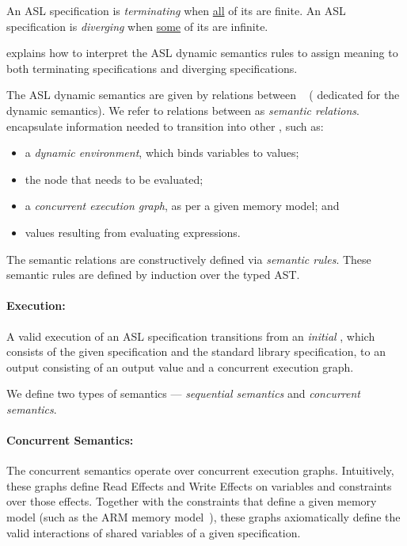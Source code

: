 An ASL specification is \emph{terminating} when \underline{all} of its \derivationtreesterm{} are finite.
An ASL specification is \emph{diverging} when \underline{some} of its \derivationtreesterm{} are
infinite.

 explains how to interpret
the ASL dynamic semantics rules to assign meaning to both terminating specifications
and diverging specifications.

\hypertarget{def-semanticconfiguration}{}
The ASL dynamic semantics are given by relations between
\emph{\semanticsconfigurationsterm}~\cite{SemanticsWithApplicationsBook}
(\configurationsterm{} dedicated for the dynamic semantics).
We refer to relations between \semanticsconfigurationsterm{} as \emph{semantic relations}.
\Semanticsconfigurationsterm{} encapsulate information needed to transition into other \semanticsconfigurationsterm{}, such as:
\begin{itemize}
  \item a \emph{dynamic environment}, which binds variables to values;
  \item the \typedast{} node that needs to be evaluated;
  \item a \emph{concurrent execution graph}, as per a given memory model; and
  \item values resulting from evaluating expressions.
\end{itemize}
The semantic relations are constructively defined via \emph{semantic rules}.
These semantic rules are defined by induction over the typed AST.

\paragraph{Execution:}
A valid execution of an ASL specification transitions from an \emph{initial \semanticsconfigurationterm{}},
which consists of the given specification and the standard library specification, to an output \semanticsconfigurationterm{}
consisting of an output value and a concurrent execution graph.

We define two types of semantics --- \emph{sequential semantics} and \emph{concurrent semantics}.

\paragraph{Concurrent Semantics:}
The concurrent semantics operate over concurrent execution graphs.
Intuitively, these graphs define Read Effects and Write Effects on variables and constraints over those effects.
Together with the constraints that define a given memory model (such as the ARM memory model~\cite{AlglaveDGHM21}),
these graphs axiomatically define
the valid interactions of shared variables of a given specification.


